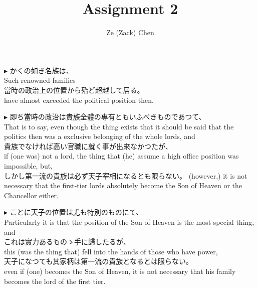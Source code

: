 \documentclass{ctexart}
\title{Assignment 2}
\author{Ze (Zack) Chen}
\makeatletter
\newcommand*{\shifttext}[1]{%
  \settowidth{\@tempdima}{#1}%
  \hspace{-\@tempdima}#1%
}
\newcommand{\plabel}[1]{%
\shifttext{\textbf{#1}\quad}%
}
\makeatother
\begin{document}
\maketitle

\plabel{$\blacktriangleright$}%
かくの如き名族は、\\
Such renowned families\\
當時の政治上の位置から殆ど超越して居る。\\
have almost exceeded the political position then.

\vspace{1em}
\plabel{$\blacktriangleright$}%
即ち當時の政治は貴族全體の專有ともいふべきものであつて、\\
That is to say, even though the thing exists that it should be said that the politics then was a exclusive belonging of the whole lords, and\\
貴族でなければ高い官職に就く事が出來なかつたが、\\
if (one was) not a lord, the thing that (he) assume a high office position was impossible, but,\\
しかし第一流の貴族は必ず天子宰相になるとも限らない。
(however,) it is not necessary that the first-tier lords absolutely become the Son of Heaven or the Chancellor either.

\vspace{1em}
\plabel{$\blacktriangleright$}%
ことに天子の位置は尤も特別のものにて、\\
Particularly it is that the position of the Son of Heaven is the most special thing, and\\
これは實力あるものゝ手に歸したるが、\\
this (was the thing that) fell into the hands of those who have power,\\
天子になつても其家柄は第一流の貴族となるとは限らない。\\
even if (one) becomes the Son of Heaven, it is not necessary that his family becomes the lord of the first tier.
\end{document}
